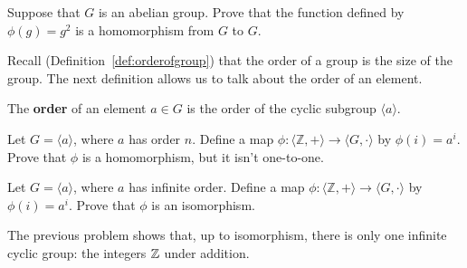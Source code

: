 \begin{problem}
Suppose that \(G\) is an abelian group. Prove that the function defined by \(\phi(g) = g^2\) is a homomorphism from \(G\) to \(G\).
\end{problem}

Recall (Definition~\ref{def:orderofgroup}) that the order of a group is the size of the group. The next definition allows us to talk about the order of an element.

\begin{definition}
    The \textbf{order} of an element $a \in G$ is the order of the cyclic subgroup $\langle a \rangle$.
\end{definition}

\begin{problem}\label{prob:finitecyclic}
Let \(G = \langle a \rangle\), where \(a\) has order \(n\). Define a map \(\phi : \langle \mathbb{Z} , + \rangle \longrightarrow \langle G, \cdot \rangle \) by \(\phi(i) = a^i\). Prove that \(\phi\) is a homomorphism, but it isn't one-to-one.
\begin{annotation}
\end{annotation}
\end{problem}

\begin{problem}\label{prob:infcyciso}
Let \(G = \langle a \rangle\), where \(a\) has infinite order. Define a map \(\phi : \langle \mathbb{Z} , + \rangle \longrightarrow \langle G, \cdot \rangle \) by \(\phi(i) = a^i\). Prove that \(\phi\) is an isomorphism.
\end{problem}

The previous problem shows that, up to isomorphism, there is only one infinite cyclic group: the integers $\mathbb{Z}$ under addition.
\begin{annotation}
\end{annotation}

